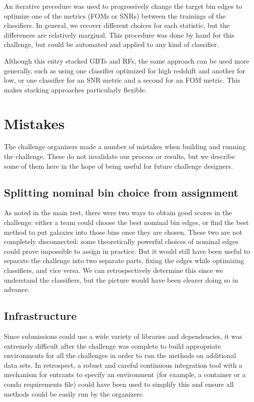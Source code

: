 \documentclass[twocolumn,twocolappendix]{aastex63}
\begin{document}
An iterative precedure was used to progressively change the target bin edges to optimize one of the metrics (FOMs or SNRs) between the trainings of the classifiers. In general, we recover different choices for each statistic, but the differences are relatively marginal. This procedure was done by hand for this challenge, but could be automated and applied to any kind of classifier.

Although this entry stacked GBTs and RFs, the same approach can be used more generally, such as using
one classifier optimized for high redshift and another for low, or one classifier for an SNR metric
and a second for an FOM metric.  This makes stacking approaches particularly flexible.


\section{Mistakes} \label{sec:mistakes}
The challenge organizers made a number of mistakes when building and running the challenge.
These do not invalidate our process or results, but we describe some of them here in the hope of
being useful for future challenge designers.

\subsection{Splitting nominal bin choice from assignment}
As noted in the main test, there were two ways to obtain good scores in the challenge: 
either a team could choose the best
nominal bin edges, or find the best method to put galaxies into those bins once they are chosen.
These two are not completely disconnected: some theoretically powerful choices of nominal edges
could prove impossible to assign in practice.  But it would still have been useful to separate
the challenge into two separate parts, fixing the edges while optimizing classifiers, and vice
versa.   We can retrospectively determine this since we understand the classifiers, but the picture
would have been clearer doing so in advance.

\subsection{Infrastructure}
Since submissions could use a wide variety of libraries and dependencies, it was extremely
difficult after the challenge was complete to build appropriate environments for all the challenges
in order to run the methods on additional data sets. In retrospect, a robust and careful
continuous integration tool with a mechanism for entrants to specify an environment (for example, a 
container or a {\sc conda} requirements file) could have been used to simplify this and ensure
all methods could be easily run by the organizers.
\end{document}
